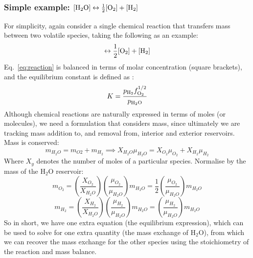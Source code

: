 \subsubsection{Simple example: $[\rm{H}_2O]\leftrightarrow \frac{1}{2} [\rm{O}_2] + [\rm{H}_2]$}
For simplicity, again consider a single chemical reaction that transfers mass between two volatile species, taking the following as an example:
\begin{equation}
    [\rm{H}_2O]\leftrightarrow \frac{1}{2} [\rm{O}_2] + [\rm{H}_2]
    \label{eq:reaction}
\end{equation}
Eq.~\ref{eq:reaction} is balanced in terms of molar concentration (square brackets), and the equilibrium constant is defined as \cite[e.g.][]{SF17}:
\begin{equation}
K=\frac{p_{\rm H_2} f_{\rm O_2}^{1/2}}{p_{\rm H_2\rm O}}
\end{equation}
Although chemical reactions are naturally expressed in terms of moles (or molecules), we need a formulation that considers mass, since ultimately we are tracking mass addition to, and removal from, interior and exterior reservoirs.  Mass is conserved:
\begin{equation}
m_{H_2O} = m_{O2} + m_{H_2} \implies X_{H_2O} \mu_{H_2O} = X_{O_2} \mu_{O_2} + X_{H_2} \mu_{H_2}
\label{eq:reaction_mass}
\end{equation}
Where $X_y$ denotes the number of moles of a particular species.  Normalise by the mass of the H$_2$O reservoir:
\begin{equation}
m_{O_2} = \left( \frac{X_{O_2}}{X_{H_2O}} \right) \left(\frac{\mu_{O_2}}{\mu_{H_2O}}\right) m_{H_2O} = \frac{1}{2} \left(\frac{\mu_{O_2}}{\mu_{H_2O}}\right) m_{H_2O}
\end{equation}
\begin{equation}
m_{H_2} = \left( \frac{X_{H_2}}{X_{H_2O}} \right) \left(\frac{\mu_{H_2}}{\mu_{H_2O}}\right) m_{H_2O} = \left(\frac{\mu_{H_2}}{\mu_{H_2O}}\right) m_{H_2O}
\end{equation}
So in short, we have one extra equation (the equilibrium expression), which can be used to solve for one extra quantity (the mass exchange of H$_2$O), from which we can recover the mass exchange for the other species using the stoichiometry of the reaction and mass balance.
